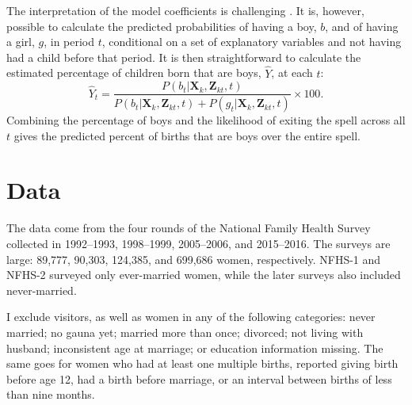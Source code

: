 \documentclass[12pt,letterpaper]{article}
\begin{document}
The interpretation of the model coefficients is challenging \citep{thomas96}.
It is, however, possible to calculate the predicted probabilities of 
having a boy, $b$, and of having a girl, $g$, in period $t$, conditional on 
a set of explanatory variables and not having had a child before that period.
It is then straightforward to calculate the estimated percentage of children born that 
are boys, $\hat{Y}$, at each $t$:  
\begin{equation}
\hat{Y}_t 
= 
\frac{ P(b_{t} | \mathbf{X}_{k}, \mathbf{Z}_{kt},t )}
{ P(b_{t} | \mathbf{X}_{k}, \mathbf{Z}_{kt},t) + P(g_{t} | \mathbf{X}_{k}, \mathbf{Z}_{kt},t )} 
\times 100.
\label{eq:probability_son}
\end{equation}
Combining the percentage of boys and the likelihood of exiting the spell 
across all $t$ gives the predicted percent of births that are boys over the entire spell.


\section{Data\label{sec:data}}

The data come from the four rounds of the National Family Health Survey
collected in 1992--1993, 1998--1999, 2005--2006, and 2015--2016.
The surveys are large: 89,777, 90,303, 124,385, and 699,686 women,
respectively. NFHS-1 and NFHS-2 surveyed only ever-married women, while
the later surveys also included never-married.

I exclude visitors, as well as women in any of the following 
categories: never married; no gauna yet; married more than once; divorced; 
not living with husband; inconsistent age at marriage; or education information missing.  
The same goes for women who had at least one multiple births, reported giving birth 
before age 12, had a birth before marriage, or an interval between births of less than 
nine months. 
\end{document}

